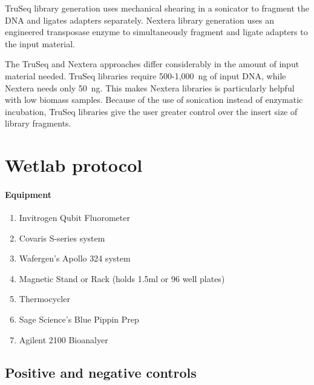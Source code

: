 \documentclass[graybox]{svmult}
\begin{document}
TruSeq library generation uses mechanical shearing in a sonicator to fragment the DNA and ligates adapters separately. 
Nextera library generation uses an engineered transposase enzyme to simultaneously fragment and ligate adapters to the input material. 

The TruSeq and Nextera approaches differ considerably in the amount of input material needed. TruSeq libraries require 500-1,000~ng of input DNA, while Nextera needs only 50~ng.  This makes Nextera libraries is particularly helpful with low biomass samples.
Because of the use of sonication instead of enzymatic incubation, TruSeq libraries give the user greater control over the insert size of library fragments.  

\section{Wetlab protocol}
\paragraph{Equipment}
\begin{svgraybox}
\begin{enumerate}
\item{    Invitrogen Qubit Fluorometer}
\item{      Covaris S-series system}
\item{      Wafergen’s Apollo 324 system}
\item{      Magnetic Stand or Rack (holds 1.5ml or 96 well plates)}
\item{      Thermocycler}
\item{      Sage Science’s Blue Pippin Prep}
\item{      Agilent 2100 Bioanalyer}
\end{enumerate}
\end{svgraybox}

\subsection{Positive and negative controls }
\end{document}
